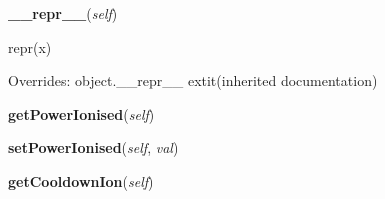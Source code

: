 \hspace{.8\funcindent}\begin{boxedminipage}{\funcwidth}

    \raggedright \textbf{\_\_repr\_\_}(\textit{self})

\setlength{\parskip}{2ex}
    repr(x)

\setlength{\parskip}{1ex}
      Overrides: object.\_\_repr\_\_ 	extit{(inherited documentation)}

    \end{boxedminipage}

    \label{systems:System:getPowerIonised}

    \vspace{0.5ex}

\hspace{.8\funcindent}\begin{boxedminipage}{\funcwidth}

    \raggedright \textbf{getPowerIonised}(\textit{self})

\setlength{\parskip}{2ex}
\setlength{\parskip}{1ex}
    \end{boxedminipage}

    \label{systems:System:setPowerIonised}

    \vspace{0.5ex}

\hspace{.8\funcindent}\begin{boxedminipage}{\funcwidth}

    \raggedright \textbf{setPowerIonised}(\textit{self}, \textit{val})

\setlength{\parskip}{2ex}
\setlength{\parskip}{1ex}
    \end{boxedminipage}

    \label{systems:System:getCooldownIon}

    \vspace{0.5ex}

\hspace{.8\funcindent}\begin{boxedminipage}{\funcwidth}

    \raggedright \textbf{getCooldownIon}(\textit{self})

\setlength{\parskip}{2ex}
\setlength{\parskip}{1ex}
    \end{boxedminipage}

